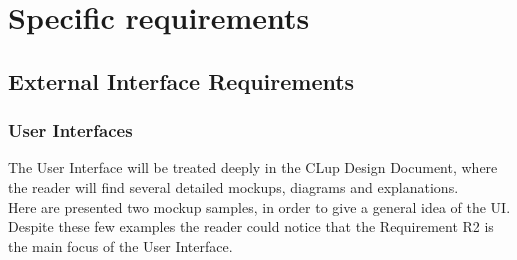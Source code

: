 \documentclass[]{article}
\begin{document}
			\newpage
	
	\section{Specific requirements}
	
		\subsection{External Interface Requirements}
			\subsubsection{User Interfaces}
			The User Interface will be treated deeply in the CLup Design Document, where the reader will find several detailed mockups, diagrams and explanations.
			\\Here are presented two mockup samples, in order to give a general idea of the UI.  Despite these few examples the reader could notice that the Requirement R2 is the main focus of the User Interface.
			\medskip
			
\end{document}
